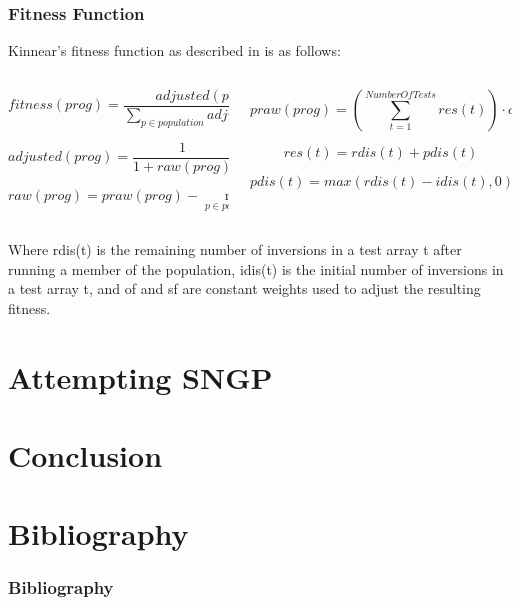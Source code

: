 \documentclass{beamer}
\begin{document}
		\begin{frame}
		
			\frametitle{Fitness Function}
			
			Kinnear's fitness function as described in \cite{kinnear_generality_1993} is as follows:
			
			
				\begin{columns}[T]
					
					\begin{column}{0.5\textwidth}
						
						\begin{tiny}
							
						$$fitness(prog) = \frac{adjusted(prog)}{\sum_{p\in population}^{}adjusted(p)}$$
						
						$$adjusted(prog) = \frac{1}{1 + raw(prog)}$$
						
						$$raw(prog) = praw(prog) - \min_{p\in population} praw(p)$$
						
						\end{tiny}
					
					
					\end{column}
					
					
					\begin{column}{0.5\textwidth}
						
						\begin{tiny}
						
						$$praw(prog) = \left(\sum_{t = 1}^{Number Of Tests}res(t)\right) \cdot of + size(prog) \cdot sf$$
						
						$$res(t) = rdis(t) + pdis(t)$$
						
						$$pdis(t) = max(rdis(t) - idis(t), 0) \cdot 100$$
						
						\end{tiny}
					\end{column}
				\end{columns}
			
			Where rdis(t) is the remaining number of inversions in a test array t after running a member of the population, idis(t) is the initial number of inversions in a test array t, and of and sf are constant weights used to adjust the resulting fitness.
		
		\end{frame}
	
	\section{Attempting SNGP}
	
	\section{Conclusion}
	
	\section{Bibliography}
	
		\begin{frame}[allowframebreaks] 
			\frametitle{Bibliography}
			
			
		\end{frame}
		
\end{document}
